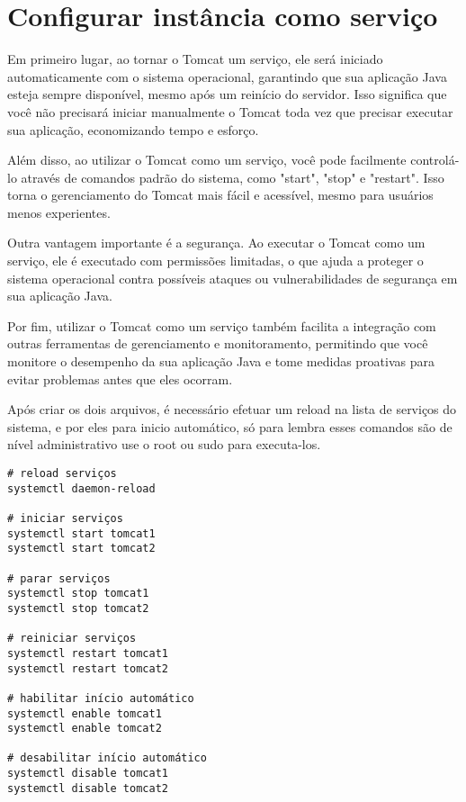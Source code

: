 \appendix
\section{Configurar instância como serviço}\label{apendice:servico}

Em primeiro lugar, ao tornar o Tomcat um serviço, ele será iniciado automaticamente com o sistema operacional, garantindo que sua aplicação Java esteja sempre disponível, mesmo após um reinício do servidor. Isso significa que você não precisará iniciar manualmente o Tomcat toda vez que precisar executar sua aplicação, economizando tempo e esforço.

Além disso, ao utilizar o Tomcat como um serviço, você pode facilmente controlá-lo através de comandos padrão do sistema, como "start", "stop" e "restart". Isso torna o gerenciamento do Tomcat mais fácil e acessível, mesmo para usuários menos experientes.

Outra vantagem importante é a segurança. Ao executar o Tomcat como um serviço, ele é executado com permissões limitadas, o que ajuda a proteger o sistema operacional contra possíveis ataques ou vulnerabilidades de segurança em sua aplicação Java.

Por fim, utilizar o Tomcat como um serviço também facilita a integração com outras ferramentas de gerenciamento e monitoramento, permitindo que você monitore o desempenho da sua aplicação Java e tome medidas proativas para evitar problemas antes que eles ocorram.

Após criar os dois arquivos, é necessário efetuar um reload na lista de serviços do sistema, e por eles para inicio automático, só para lembra esses comandos são de nível administrativo use o root ou sudo para executa-los.

\begin{verbatim}
# reload serviços
systemctl daemon-reload

# iniciar serviços
systemctl start tomcat1
systemctl start tomcat2

# parar serviços
systemctl stop tomcat1
systemctl stop tomcat2

# reiniciar serviços
systemctl restart tomcat1
systemctl restart tomcat2

# habilitar início automático
systemctl enable tomcat1
systemctl enable tomcat2

# desabilitar início automático
systemctl disable tomcat1
systemctl disable tomcat2

\end{verbatim}

